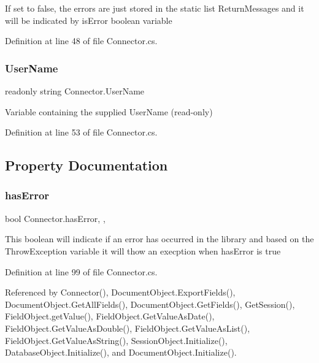 If set to false, the errors are just stored in the static list Return\+Messages and it will be indicated by is\+Error boolean variable

Definition at line 48 of file Connector.\+cs.

\mbox{\label{class_connector_a41d247f09774f0ed206ce1a4a2463fed}} 
\subsubsection{\texorpdfstring{User\+Name}{UserName}}
{\footnotesize\ttfamily readonly string Connector.\+User\+Name}



Variable containing the supplied User\+Name (read-\/only) 



Definition at line 53 of file Connector.\+cs.



\subsection{Property Documentation}
\mbox{\label{class_connector_a079bae21a5417efa53bfe8954c0f533f}} 
\subsubsection{\texorpdfstring{has\+Error}{hasError}}
{\footnotesize\ttfamily bool Connector.\+has\+Error\hspace{0.3cm}{\ttfamily [static]}, {\ttfamily [get]}, {\ttfamily [set]}}



This boolean will indicate if an error has occurred in the library and based on the Throw\+Exception variable it will thow an execption when has\+Error is true 



Definition at line 99 of file Connector.\+cs.



Referenced by Connector(), Document\+Object.\+Export\+Fields(), Document\+Object.\+Get\+All\+Fields(), Document\+Object.\+Get\+Fields(), Get\+Session(), Field\+Object.\+get\+Value(), Field\+Object.\+Get\+Value\+As\+Date(), Field\+Object.\+Get\+Value\+As\+Double(), Field\+Object.\+Get\+Value\+As\+List(), Field\+Object.\+Get\+Value\+As\+String(), Session\+Object.\+Initialize(), Database\+Object.\+Initialize(), and Document\+Object.\+Initialize().

